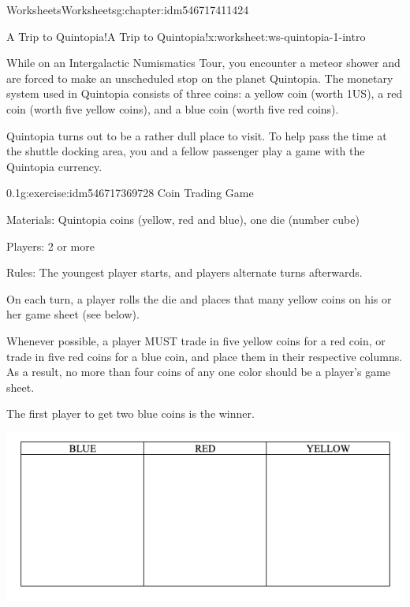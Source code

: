 \documentclass[twoside,11pt,]{book}
\begin{document}
\begin{chapterptx}{Worksheets}{}{Worksheets}{}{}{g:chapter:idm546717411424}
%
%
\typeout{************************************************}
\typeout{************************************************}
%
\begin{worksheet-section-numberless}{A Trip to Quintopia!}{}{A Trip to Quintopia!}{}{}{x:worksheet:ws-quintopia-1-intro}
\begin{introduction}{}%
While on an Intergalactic Numismatics Tour, you encounter a meteor shower and are forced to make an unscheduled stop on the planet Quintopia.  The monetary system used in Quintopia consists of three coins:  a yellow coin (worth \textdollar{}1US), a red coin (worth five yellow coins), and a blue coin (worth five red coins).%
\par
Quintopia turns out to be a rather dull place to visit.  To help pass the time at the shuttle docking area, you and a fellow passenger play a game with the Quintopia currency.%
\end{introduction}%
\begin{divisionexercise}{1}{}{0.1}{g:exercise:idm546717369728}%
Coin Trading Game%
\par
Materials:  Quintopia coins (yellow, red and blue), one die (number cube)%
\par
Players:  2 or more%
\par
Rules:  The youngest player starts, and players alternate turns afterwards.%
\par
On each turn, a player rolls the die and places that many yellow coins on his or her game sheet (see below).%
\par
Whenever possible, a player MUST trade in five yellow coins for a red coin, or trade in five red coins for a blue coin, and place them in their respective columns.  As a result, no more than four coins of any one color should be a player’s game sheet.%
\par
The first player to get two blue coins is the winner.%
\begin{sidebyside}{1}{0.05}{0.05}{0}%
\begin{sbspanel}{0.9}%
\includegraphics[width=1\linewidth]{images/quintopia-table.png}

\end{sbspanel}
\end{sidebyside}
\end{divisionexercise}
\end{worksheet-section-numberless}
\end{chapterptx}
\end{document}
